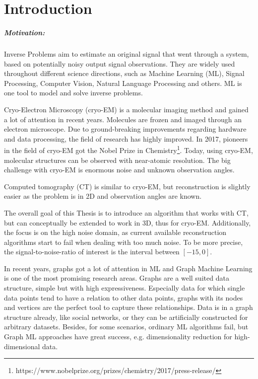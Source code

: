 \chapter{Introduction}
\label{sec:introduction}

\paragraph{Motivation:}
Inverse Problems aim to estimate an original signal that went through a system, 
based on potentially noisy output signal observations.
They are widely used throughout different science directions, such as Machine Learning (ML),
Signal Processing, Computer Vision, Natural Language Processing and others.
ML is one tool to model and solve inverse problems.

Cryo-Electron Microscopy (cryo-EM) is a molecular imaging method and gained a lot of attention in recent years. 
Molecules are frozen and imaged through an electron microscope.
Due to ground-breaking improvements regarding hardware and data processing, the field of research
has highly improved. In 2017, pioneers in the field of cryo-EM got the 
Nobel Prize in Chemistry\footnote{https://www.nobelprize.org/prizes/chemistry/2017/press-release/}.
Today, using cryo-EM, molecular structures can be observed with near-atomic resolution.
The big challenge with cryo-EM is enormous noise and unknown observation angles.

Computed tomography (CT) is similar to cryo-EM, but reconstruction is slightly easier
as the problem is in 2D and observation angles are known.

The overall goal of this Thesis is to introduce an algorithm that works with CT, but 
can conceptually be extended to work in 3D, thus for cryo-EM. 
Additionally, the focus is on the high noise domain, as current available reconstruction algorithms
start to fail when dealing with too much noise. To be more precise, the signal-to-noise-ratio of interest is the interval 
 between $[-15, 0]$.


In recent years, graphs got a lot of attention in ML and Graph Machine Learning is one of the most promising research areas.
Graphs are a well suited data structure, simple but with high expressiveness. 
Especially data for which single data points tend to have a relation to other data points, graphs with its nodes and vertices are the perfect tool
to capture these relationships. 
Data is in a graph structure already, like social networks, or they can be artificially constructed for arbitrary datasets.
Besides, for some scenarios, ordinary ML algorithms fail, but Graph ML approaches have great success, e.g. dimensionality reduction for high-dimensional data.



